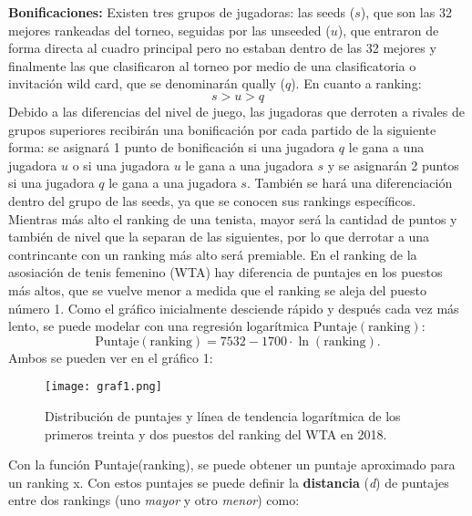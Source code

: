 \documentclass[a4paper]{article}
\begin{document}
\textbf{Bonificaciones:} Existen tres grupos de jugadoras: las seeds ($s$), que son las 32 mejores rankeadas del torneo, seguidas por las unseeded ($u$), que entraron de forma directa al cuadro principal pero no estaban dentro de las 32 mejores y finalmente las que clasificaron al torneo por medio de una clasificatoria o invitación wild card, que se denominarán qually ($q$). \newline
En cuanto a ranking:  	
\begin{equation*}
    s > u > q
\end{equation*}
Debido a las diferencias del nivel de juego, las jugadoras que derroten a rivales de grupos superiores recibirán una bonificación por cada partido de la siguiente forma: se asignará 1 punto de bonificación si una jugadora $q$ le gana a una jugadora $u$ o si una jugadora $u$ le gana a una jugadora $s$ y se asignarán 2 puntos si una jugadora $q$ le gana a una jugadora $s$. \newline\newline También se hará una diferenciación dentro del grupo de las seeds, ya que se conocen sus rankings específicos. Mientras más alto el ranking de una tenista, mayor será la cantidad de puntos y también de nivel que la separan de las siguientes, por lo que derrotar a una contrincante con un ranking más alto será premiable. \newline\newline En el ranking de la asosiación de tenis femenino (WTA) hay diferencia de puntajes en los puestos más altos, que se vuelve menor a medida que el ranking se aleja del puesto número 1. Como el gráfico inicialmente desciende rápido y después cada vez más lento, se puede modelar con una regresión logarítmica $\text{Puntaje}(\text{ranking})$:
\begin{equation*}
    \text{Puntaje}(\text{ranking})= 7532 - 1700 · \ln(\text{ranking}) . 
\end{equation*}
Ambos se pueden ver en el gráfico 1:\newline
\begin{figure}[H]
    \begin{center}
    \texttt{[image: graf1.png]}    
    \end{center}    
    \caption{Distribución de puntajes y línea de tendencia logarítmica de los primeros treinta y dos puestos del ranking del WTA en 2018.}
\end{figure}
Con la función Puntaje(ranking), se puede obtener un puntaje aproximado para un ranking x. Con estos puntajes se puede definir la \textbf{distancia} (\textit{d}) de puntajes entre dos rankings (uno \textit{mayor} y otro \textit{menor}) como:
\end{document}

